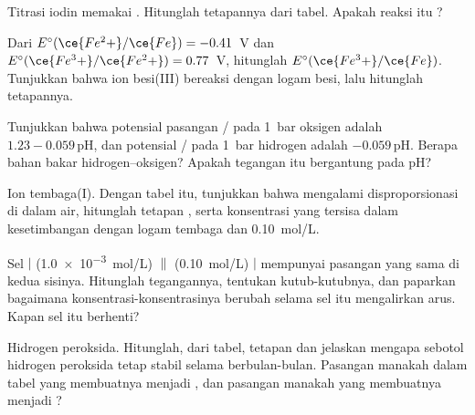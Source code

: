 \begin{exercise}[$\star\star$]\label{exo:b1:nernst:7}
Titrasi iodin memakai . Hitunglah
tetapannya dari tabel. Apakah reaksi itu ?
\end{exercise}

\begin{exercise}[$\star\star$]\label{exo:b1:nernst:8}
Dari $E^\circ(\ce{Fe^2+}/\ce{Fe}) = -0.41$~V dan $E^\circ(\ce{Fe^3+}/\ce{Fe^2+})
= 0.77$~V, hitunglah $E^\circ(\ce{Fe^3+}/\ce{Fe})$. Tunjukkan bahwa ion
besi(III) bereaksi dengan logam besi, lalu hitunglah tetapannya.
\end{exercise}

\begin{exercise}[$\star\star$]\label{exo:b1:nernst:9}
Tunjukkan bahwa potensial pasangan / pada \qty{1}{bar}
oksigen adalah $1.23 - 0.059\,\mathrm{pH}$, dan potensial /
pada \qty{1}{bar} hidrogen adalah $-0.059\,\mathrm{pH}$. Berapa  bahan bakar hidrogen--oksigen? Apakah tegangan itu bergantung pada
pH?
\end{exercise}

\begin{exercise}[$\star\star\star$]\label{exo:b1:nernst:10}
Ion tembaga(I). Dengan tabel itu, tunjukkan bahwa  mengalami
disproporsionasi di dalam air, hitunglah tetapan
, serta konsentrasi  yang tersisa dalam
kesetimbangan dengan logam tembaga dan  \qty{0.10}{mol/L}.
\end{exercise}

\begin{exercise}[$\star\star\star$]\label{exo:b1:nernst:11}
Sel  $|$  (\qty{1.0e-3}{mol/L}) $\|$ 
(\qty{0.10}{mol/L}) $|$  mempunyai pasangan yang sama di kedua
sisinya. Hitunglah tegangannya, tentukan kutub-kutubnya, dan paparkan
bagaimana konsentrasi-konsentrasinya berubah selama sel itu mengalirkan
arus. Kapan sel itu berhenti?
\end{exercise}

\begin{exercise}[$\star\star\star$]\label{exo:b1:nernst:12}
Hidrogen peroksida. Hitunglah, dari tabel, tetapan
 dan jelaskan mengapa sebotol hidrogen peroksida
tetap stabil selama berbulan-bulan. Pasangan manakah dalam tabel yang
membuatnya menjadi , dan pasangan manakah yang membuatnya
menjadi ?
\end{exercise}

